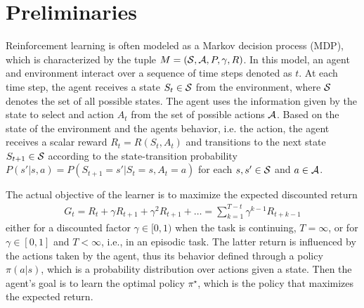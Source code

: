 \section{Preliminaries}
Reinforcement learning is often modeled as a Markov decision process (MDP), which is characterized by the tuple $M = (\mathcal{S}, \mathcal{A}, P, \gamma, R)$. In this model, an agent and environment interact over a sequence of time steps denoted as $t$. At each time step, the agent receives a state $S_t \in \mathcal{S}$ from the environment, where $\mathcal{S}$ denotes the set of all possible states. The agent uses the information given by the state to select and action $A_t$ from the set of possible actions $\mathcal{A}$. Based on the state of the environment and the agents behavior, i.e. the action, the agent receives a scalar reward $R_t = R(S_t,A_t)$ and transitions to the next state $S_{t+1} \in \mathcal{S}$ according to the state-transition probability $P(s'|s,a) = P(S_{t+1} = s' | S_t = s, A_t = a)$ for each $s,s' \in \mathcal{S}$ and $a \in \mathcal{A}$.

The actual objective of the learner is to maximize the expected discounted return
\begin{align*}
    G_t = R_{t} + \gamma R_{t+1} + \gamma^2 R_{t+1} + \dots = \sum_{k=1}^{T-t} \gamma^{k-1} R_{t+k-1}
\end{align*}
either for a discounted factor $\gamma \in [0,1)$ when the task is continuing, $T = \infty$, or for $\gamma \in [0,1]$ and $T < \infty$, i.e., in an episodic task. The latter return is influenced by the actions taken by the agent, thus its behavior defined through a policy $\pi (a|s)$, which is a probability distribution over actions given a state. Then the agent's goal is to learn the optimal policy $\pi^\star$, which is the policy that maximizes the expected return.

